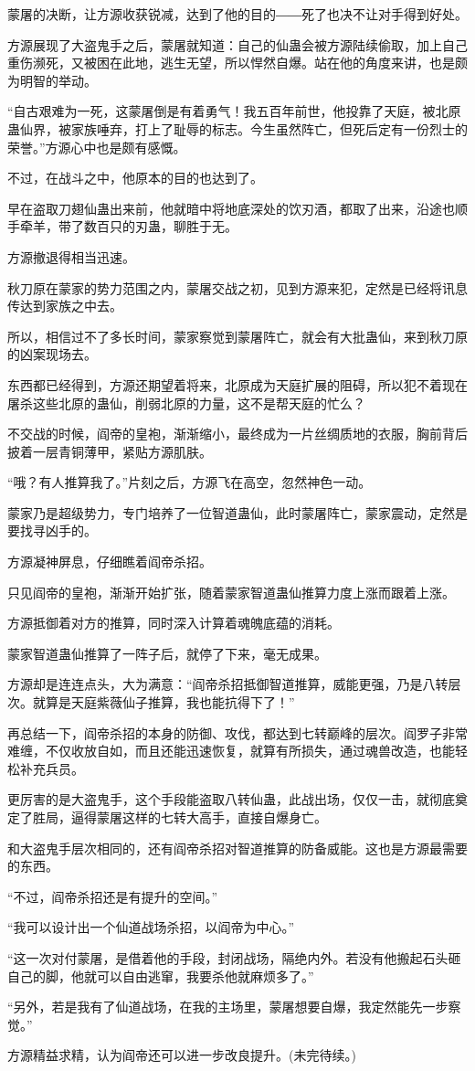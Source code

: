 \begin{this_body}
蒙屠的决断，让方源收获锐减，达到了他的目的――死了也决不让对手得到好处。

方源展现了大盗鬼手之后，蒙屠就知道：自己的仙蛊会被方源陆续偷取，加上自己重伤濒死，又被困在此地，逃生无望，所以悍然自爆。站在他的角度来讲，也是颇为明智的举动。

“自古艰难为一死，这蒙屠倒是有着勇气！我五百年前世，他投靠了天庭，被北原蛊仙界，被家族唾弃，打上了耻辱的标志。今生虽然阵亡，但死后定有一份烈士的荣誉。”方源心中也是颇有感慨。

不过，在战斗之中，他原本的目的也达到了。

早在盗取刀翅仙蛊出来前，他就暗中将地底深处的饮刃酒，都取了出来，沿途也顺手牵羊，带了数百只的刃蛊，聊胜于无。

方源撤退得相当迅速。

秋刀原在蒙家的势力范围之内，蒙屠交战之初，见到方源来犯，定然是已经将讯息传达到家族之中去。

所以，相信过不了多长时间，蒙家察觉到蒙屠阵亡，就会有大批蛊仙，来到秋刀原的凶案现场去。

东西都已经得到，方源还期望着将来，北原成为天庭扩展的阻碍，所以犯不着现在屠杀这些北原的蛊仙，削弱北原的力量，这不是帮天庭的忙么？

不交战的时候，阎帝的皇袍，渐渐缩小，最终成为一片丝绸质地的衣服，胸前背后披着一层青铜薄甲，紧贴方源肌肤。

“哦？有人推算我了。”片刻之后，方源飞在高空，忽然神色一动。

蒙家乃是超级势力，专门培养了一位智道蛊仙，此时蒙屠阵亡，蒙家震动，定然是要找寻凶手的。

方源凝神屏息，仔细瞧着阎帝杀招。

只见阎帝的皇袍，渐渐开始扩张，随着蒙家智道蛊仙推算力度上涨而跟着上涨。

方源抵御着对方的推算，同时深入计算着魂魄底蕴的消耗。

蒙家智道蛊仙推算了一阵子后，就停了下来，毫无成果。

方源却是连连点头，大为满意：“阎帝杀招抵御智道推算，威能更强，乃是八转层次。就算是天庭紫薇仙子推算，我也能抗得下了！”

再总结一下，阎帝杀招的本身的防御、攻伐，都达到七转巅峰的层次。阎罗子非常难缠，不仅收放自如，而且还能迅速恢复，就算有所损失，通过魂兽改造，也能轻松补充兵员。

更厉害的是大盗鬼手，这个手段能盗取八转仙蛊，此战出场，仅仅一击，就彻底奠定了胜局，逼得蒙屠这样的七转大高手，直接自爆身亡。

和大盗鬼手层次相同的，还有阎帝杀招对智道推算的防备威能。这也是方源最需要的东西。

“不过，阎帝杀招还是有提升的空间。”

“我可以设计出一个仙道战场杀招，以阎帝为中心。”

“这一次对付蒙屠，是借着他的手段，封闭战场，隔绝内外。若没有他搬起石头砸自己的脚，他就可以自由逃窜，我要杀他就麻烦多了。”

“另外，若是我有了仙道战场，在我的主场里，蒙屠想要自爆，我定然能先一步察觉。”

方源精益求精，认为阎帝还可以进一步改良提升。(未完待续。)

\end{this_body}

